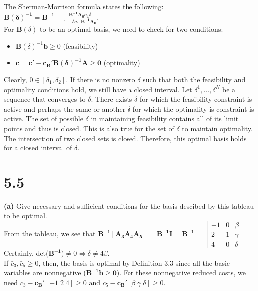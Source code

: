 \documentclass{article}
\begin{document}
\noindent
The Sherman-Morrison formula states the following:  $\mathbf{B(\delta)^{-1} = B^{-1} - } \frac{ \mathbf{B^{-1} A_0 e_1} \delta }{1 + \delta \mathbf{e_1' B^{-1} A_0}} $. \\
For $\mathbf{B}(\delta)$ to be an optimal basis, we need to check for two conditions:
\begin{itemize}
	\item $\mathbf{B}(\delta)^{-1} \mathbf{b} \geq 0$ (feasibility) 
	\item $\mathbf{ \bar{c} = c' - c_B' B(\delta)^{-1}A \geq 0 }$ (optimality)
\end{itemize}

\noindent
Clearly, $0 \in [\delta_1, \delta_2].$  If there is no nonzero $\delta$ such that both the feasibility and optimality conditions hold, we still have a closed interval.  Let $\delta^1, \ldots, \delta^N$ be a sequence that converges to $\delta$.  There exists $\delta$ for which the feasibility constraint is active and perhaps the same or another $\delta$ for which the optimality is constraint is active.  The set of possible $\delta$ in maintaining feasibility contains all of its limit points and thus is closed.  This is also true for the set of $\delta$ to maintain optimality.  The intersection of two closed sets is closed.  Therefore, this optimal basis holds for a closed interval of $\delta$.

\section*{5.5}

\textbf{(a)} Give necessary and sufficient conditions for the basis descibed by this tableau to be optimal. \\

\noindent 
From the tableau, we see that $\mathbf{B^{-1} [A_3 A_4 A_5] = B^{-1} I = B^{-1} = } 
\begin{bmatrix}
-1 & 0 & \beta \\
 2 & 1 & \gamma \\
 4 & 0 & \delta
\end{bmatrix}
$ \\
Certainly, det($\mathbf{B^{-1}}) \neq 0 \Leftrightarrow \delta \neq 4 \beta$. \\

\noindent If $\bar{c}_3, \bar{c}_5 \geq 0$, then, the basis is optimal by Definition 3.3 since all the basic variables are nonnegative ($\mathbf{B^{-1}b \geq 0}$). For these nonnegative reduced costs, we need $c_3 - \mathbf{c_B'} [-1 \; 2 \; 4] \geq 0 \text{ and } c_5 - \mathbf{c_B'} [\beta \;  \gamma \; \delta] \geq 0$.\\
\end{document}
